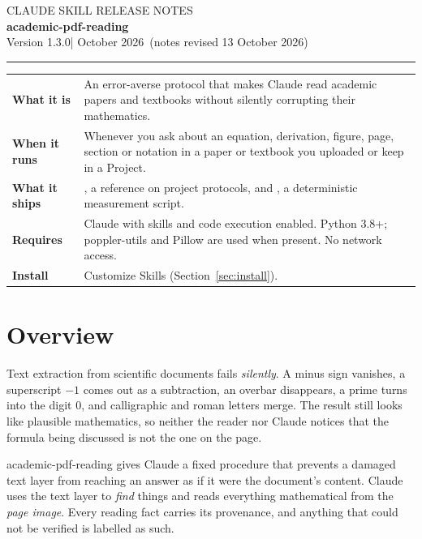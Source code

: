 \documentclass[11pt,a4paper]{article}
\newcommand\skillname{academic-pdf-reading}
\newcommand\skillversion{1.3.0}
\newcommand\skilldate{11 October 2026}
\newcommand\skillrevised{13 October 2026}
\begin{document}
\thispagestyle{plain}
\begin{flushleft}
{\sffamily\small\color{muted}\MakeUppercase{Claude skill \textbullet{} Release notes}}\\[4pt]
{\sffamily\fontsize{26}{30}\selectfont\bfseries\color{accent}\skillname}\\[6pt]
{\sffamily\large Version \skillversion\quad\textcolor{muted}{|}\quad \skilldate\
  \textcolor{muted}{(notes revised \skillrevised)}}\\[2pt]
{\color{accent}\rule{\linewidth}{0.8pt}}
\end{flushleft}

\begin{glance}
\begin{tabularx}{\linewidth}{@{}l X@{}}
\textbf{What it is} & An error-averse protocol that makes Claude read academic papers and
  textbooks without silently corrupting their mathematics. \\
\textbf{When it runs} & Whenever you ask about an equation, derivation, figure, page, section or
  notation in a paper or textbook you uploaded or keep in a Project. \\
\textbf{What it ships} & \code{SKILL.md}, a reference on project protocols, and
  \code{triage.py}, a deterministic measurement script. \\
\textbf{Requires} & Claude with skills and code execution enabled. Python 3.8+; poppler-utils
  and Pillow are used when present. No network access. \\
\textbf{Install} & \textsf{Customize \textrightarrow{} Skills} (Section~\ref{sec:install}).
\end{tabularx}
\end{glance}

\section{Overview}

Text extraction from scientific documents fails \emph{silently}. A minus sign vanishes, a
superscript $-1$ comes out as a subtraction, an overbar disappears, a prime turns into the
digit 0, and calligraphic and roman letters merge. The result still looks like plausible
mathematics, so neither the reader nor Claude notices that the formula being discussed is
not the one on the page.

\skillname{} gives Claude a fixed procedure that prevents a damaged text layer from reaching
an answer as if it were the document's content. Claude uses the text layer to \emph{find}
things and reads everything mathematical from the \emph{page image}. Every reading fact
carries its provenance, and anything that could not be verified is labelled as such.
\end{document}
